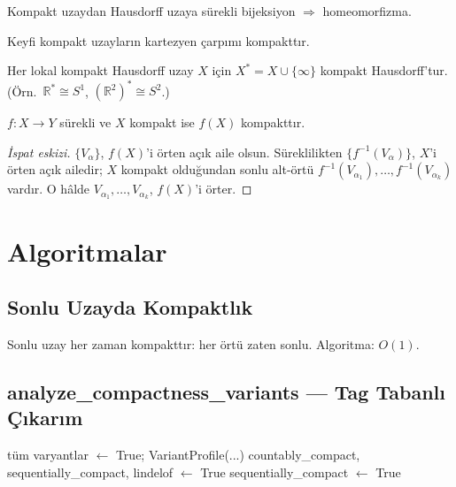 \begin{theorem}
Kompakt uzaydan Hausdorff uzaya sürekli bijeksiyon $\Rightarrow$ homeomorfizma.
\end{theorem}

\begin{theorem}[Tychonoff]
Keyfi kompakt uzayların kartezyen çarpımı kompakttır.
\end{theorem}

\begin{theorem}
Her lokal kompakt Hausdorff uzay $X$ için $X^* = X \cup \{\infty\}$ kompakt
Hausdorff'tur. (Örn.\ $\mathbb{R}^* \cong S^1$, $(\mathbb{R}^2)^* \cong S^2$.)
\end{theorem}

\begin{theorem}
$f: X \to Y$ sürekli ve $X$ kompakt ise $f(X)$ kompakttır.
\end{theorem}

\begin{proof}[İspat eskizi]
$\{V_\alpha\}$, $f(X)$'i örten açık aile olsun. Süreklilikten
$\{f^{-1}(V_\alpha)\}$, $X$'i örten açık ailedir; $X$ kompakt olduğundan sonlu
alt-örtü $f^{-1}(V_{\alpha_1}),\dots,f^{-1}(V_{\alpha_k})$ vardır. O hâlde
$V_{\alpha_1},\dots,V_{\alpha_k}$, $f(X)$'i örter.
\end{proof}

\section{Algoritmalar}

\subsection{Sonlu Uzayda Kompaktlık}

Sonlu uzay her zaman kompakttır: her örtü zaten sonlu.
Algoritma: $O(1)$.

\subsection{analyze\_compactness\_variants — Tag Tabanlı Çıkarım}

\begin{algorithm}
\caption{AnalyzeVariants$(X, \tau)$}
\begin{algorithmic}[1]
    \State tüm varyantlar $\leftarrow$ True; \Return VariantProfile(...)
\EndIf
{}
    \State countably\_compact, sequentially\_compact, lindelof $\leftarrow$ True
\EndIf
{}
    \State sequentially\_compact $\leftarrow$ True
\EndIf
\end{algorithmic}
\end{algorithm}

